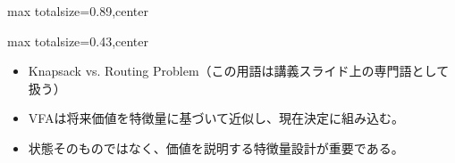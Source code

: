 \begin{minipage}[t]{0.58\textwidth}
\begin{adjustbox}{max totalsize={\textwidth}{0.89\textheight},center}
\begin{minipage}{\textwidth}
\end{minipage}
\end{adjustbox}
\end{minipage}


\clearpage
{}
\begin{minipage}[t]{0.405\textwidth}
\begin{adjustbox}{max totalsize={\textwidth}{0.43\textheight},center}
\begin{minipage}{\textwidth}\scriptsize
{}\begin{itemize}
\item Knapsack vs. Routing Problem（この用語は講義スライド上の専門語として扱う）
\end{itemize}\begin{itemize}
\item VFAは将来価値を特徴量に基づいて近似し、現在決定に組み込む。
\item 状態そのものではなく、価値を説明する特徴量設計が重要である。
\end{itemize}
\end{minipage}
\end{adjustbox}
\end{minipage}\hfill
